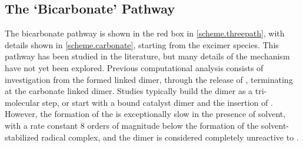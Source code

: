 \subsection{The `Bicarbonate' Pathway}\label{ss.carbonate}

The bicarbonate pathway is shown in the red box in \autoref{scheme.threepath}, with details shown in \autoref{scheme.carbonate}, starting from the excimer species. This pathway has been studied in the literature, but many details of the mechanism have not yet been explored. Previous computational analysis consists of investigation from the formed  linked dimer, through the release of , terminating at the carbonate linked dimer. Studies typically build the dimer as a tri-molecular step, or start with a  bound catalyst dimer and the insertion of \autocite{agarwal2012b}. However, the formation of the  is exceptionally slow in the presence of solvent, with a rate constant 8 orders of magnitude below the formation of the solvent-stabilized radical  complex\autocite{fujita2004}, and the  dimer is considered completely unreactive to \autocite{hayashi2003}. 

